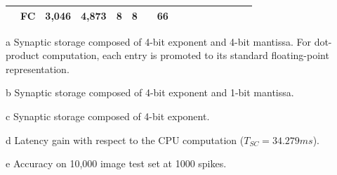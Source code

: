 \begin{table}[!t]
\begin{threeparttable}
\begin{tabular}{lrrrrrrrrrrrrrrr}
			&FC &3,046 &4,873 &8 &8 & &66 & & & & & & & \\
			\bottomrule
		\end{tabular}
		\begin{tablenotes}
			\scriptsize
			\item[a] Synaptic storage composed of 4-bit exponent and 4-bit mantissa. For dot-product computation, each entry is promoted to its standard floating-point representation.
			\item[b] Synaptic storage composed of 4-bit exponent and 1-bit mantissa.
			\item[c] Synaptic storage composed of 4-bit exponent.
			\item[d] Latency gain with respect to the CPU computation ($T_{SC} = 34.279 ms$).
			\item[e] Accuracy on 10,000 image test set at 1000 spikes.
		\end{tablenotes}
	\end{threeparttable}
\end{table}